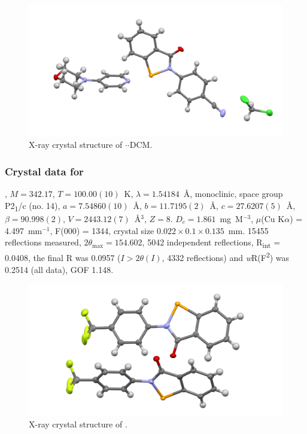 \begin{refsection}
\begin{figure}
  \includegraphics[width=0.6\linewidth]{Figures/ebs-4cn-morph-dcm-xtal.pdf}
  \caption{X-ray crystal structure of \texorpdfstring{$ \cdot $$ \cdot $DCM}{C24 H22 Cl2 N4 O2 Se}.}
\end{figure}

\subsubsection{Crystal data for \texorpdfstring{}{C14 H8 F3 N O Se}}
, $M=342.17$, $T=100.00(10)$~K, $\lambda=1.54184$~\AA, monoclinic, space group P2\textsubscript{1}/c (no. 14), $a = 7.54860(10)$~\AA, $b = 11.7195(2)$~\AA, $c = 27.6207(5)$~\AA, $\beta = 90.998(2)$\degree, $V = 2443.12(7)$~\AA$^{3}$, $Z = 8$. $D_{c}= 1.861$~mg~M$^{-3}$, $\mu$(Cu K$\alpha$) = 4.497~mm$^{-1}$, F(000) = 1344, crystal size $0.022 \times 0.1 \times 0.135$~mm. 15455 reflections measured, $2\theta_{\max}=154.602$\degree, 5042 independent reflections, R\textsubscript{int} = 0.0408, the final R was 0.0957 ($I > 2\theta(I)$, 4332 reflections) and \textit{w}R(F\textsuperscript{2}) was 0.2514 (all data), GOF 1.148.

\begin{figure}
  \includegraphics[width=0.6\linewidth]{Figures/ebs-4cf3-xtal.pdf}
  \caption{X-ray crystal structure of \texorpdfstring{}{C14 H8 F3 N O Se}.}
\end{figure}


\end{refsection}

